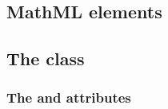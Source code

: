 \subsection{MathML elements}
\label{new-primitive-types}



\subsection{The  class}
\label{group-class}

\subsubsection{The \fixttspace{} and \fixttspace{} attributes}
\label{group-idname-attributes}



